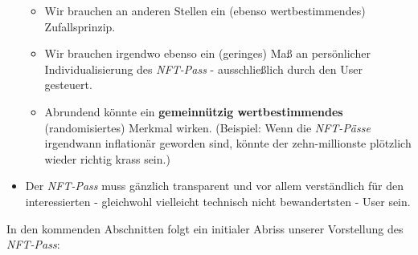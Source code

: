 \begin{itemize}
\begin{itemize}
    \item Wir brauchen an anderen Stellen ein (ebenso wertbestimmendes) Zufallsprinzip.
    \item Wir brauchen irgendwo ebenso ein (geringes) Maß an persönlicher Individua\-lisierung des \textit{NFT-Pass} - ausschließlich durch den User gesteuert.
    \item Abrundend könnte ein \textbf{gemeinnützig wertbestimmendes} (randomisiertes) Merkmal wirken. (Beispiel: Wenn die \textit{NFT-Pässe} irgendwann inflationär geworden sind, könnte der zehn-millionste plötzlich wieder richtig krass sein.)
  \end{itemize}
  \item Der \textit{NFT-Pass} muss gänzlich transparent und vor allem verständlich für den interessierten - gleichwohl vielleicht technisch nicht bewandertsten - User sein.
\end{itemize}

\vspace{0.3cm}

In den kommenden Abschnitten folgt ein initialer Abriss unserer Vorstellung des \textit{NFT-Pass}:

\vspace{0.3cm}